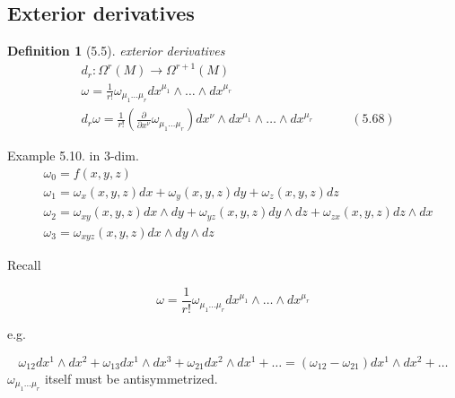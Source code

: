 \documentclass{book}
\newtheorem{definition}{Definition}
\begin{document}
\subsection{ Exterior derivatives }

\begin{definition}[5.5] exterior derivatives 
\[
\begin{aligned}
  & d_r : \Omega^r(M) \to \Omega^{r+1}(M) \\ 
  & \omega = \frac{1}{r!} \omega_{ \mu_1 \dots \mu_r} dx^{\mu_1} \wedge \dots \wedge dx^{\mu_r} \\  
  & d_r \omega = \frac{1}{r!} \left( \frac{ \partial }{ \partial x^{\nu }} \omega_{\mu_1 \dots \mu_r} \right) dx^{\nu} \wedge dx^{\mu_1} \wedge \dots \wedge dx^{\mu_r} \quad \quad \quad (5.68)
\end{aligned}
\]
\end{definition}


Example 5.10.  in 3-dim. 
\[
\begin{aligned}
  & \omega_0 = f(x,y,z) \\ 
  & \omega_1 = \omega_x(x,y,z) dx + \omega_y(x,y,z)dy + \omega_z(x,y,z) dz \\ 
  & \omega_2 = \omega_{xy}(x,y,z) dx \wedge dy + \omega_{yz}(x,y,z) dy \wedge dz + \omega_{zx}(x,y,z) dz \wedge dx \\ 
  & \omega_3 = \omega_{xyz}(x,y,z) dx \wedge dy \wedge dz
\end{aligned}
\]

Recall

\[
\omega = \frac{1}{r!} \omega_{ \mu_1 \dots \mu_r} dx^{\mu_1} \wedge \dots \wedge dx^{\mu_r}
\]

e.g.

\[
\omega_{12} dx^1 \wedge dx^2 + \omega_{13} dx^1 \wedge dx^3 + \omega_{21} dx^2 \wedge dx^1 + \dots = (\omega_{12} - \omega_{21} ) dx^1 \wedge dx^2 + \dots 
\]
$\omega_{\mu_1 \dots \mu_r}$ itself must be antisymmetrized. 
\end{document}
